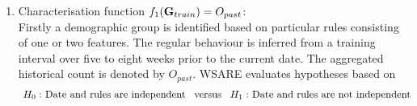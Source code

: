 \begin{enumerate}[1.]
\item Characterisation function $f_1({\bf G}_{train})=O_{past}$: \\  
Firstly a demographic group is identified based on particular rules consisting of one or two features. 
 The regular behaviour is inferred from a training interval  over five to eight weeks prior to the current date. The  aggregated historical count is denoted by $O_{past}$. WSARE evaluates hypotheses based on 
\begin{align}
&\mbox{ $H_0:$ Date and rules are independent   \, versus \,  $H_1:$ Date and  rules are not independent  }
\label{Hyp:WSARE} 
\end{align}
\end{enumerate}
